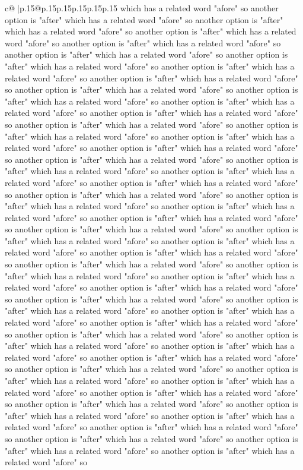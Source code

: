 \documentclass{article}
\begin{document}
{\begin{supertabular}{c@{$\;$}|p{.15\linewidth}@{}p{.15\linewidth}p{.15\linewidth}p{.15\linewidth}p{.15\linewidth}p{.15\linewidth}}
{{{which has a related word "afore" so another option is "after" which has a related word "afore" so another option is "after" which has a related word "afore" so another option is "after" which has a related word "afore" so another option is "after" which has a related word "afore" so another option is "after" which has a related word "afore" so another option is "after" which has a related word "afore" so another option is "after" which has a related word "afore" so another option is "after" which has a related word "afore" so another option is "after" which has a related word "afore" so another option is "after" which has a related word "afore" so another option is "after" which has a related word "afore" so another option is "after" which has a related word "afore" so another option is "after" which has a related word "afore" so another option is "after" which has a related word "afore" so another option is "after" which has a related word "afore" so another option is "after" which has a related word "afore" so another option is "after" which has a related word "afore" so another option is "after" which has a related word "afore" so another option is "after" which has a related word "afore" so another option is "after" which has a related word "afore" so another option is "after" which has a related word "afore" so another option is "after" which has a related word "afore" so another option is "after" which has a related word "afore" so another option is "after" which has a related word "afore" so another option is "after" which has a related word "afore" so another option is "after" which has a related word "afore" so another option is "after" which has a related word "afore" so another option is "after" which has a related word "afore" so another option is "after" which has a related word "afore" so another option is "after" which has a related word "afore" so another option is "after" which has a related word "afore" so another option is "after" which has a related word "afore" so another option is "after" which has a related word "afore" so another option is "after" which has a related word "afore" so another option is "after" which has a related word "afore" so another option is "after" which has a related word "afore" so another option is "after" which has a related word "afore" so another option is "after" which has a related word "afore" so another option is "after" which has a related word "afore" so another option is "after" which has a related word "afore" so another option is "after" which has a related word "afore" so another option is "after" which has a related word "afore" so another option is "after" which has a related word "afore" so another option is "after" which has a related word "afore" so another option is "after" which has a related word "afore" so another option is "after" which has a related word "afore" so another option is "after" which has a related word "afore" so another option is "after" which has a related word "afore" so another option is "after" which has a related word "afore" so another option is "after" which has a related word "afore" so another option is "after" which has a related word "afore" so }}}
\end{supertabular}}
\end{document}
